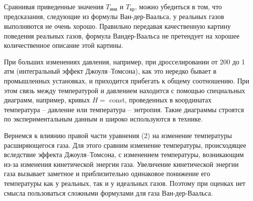 \documentclass[a4paper, 12pt]{article}
\begin{document}
\indent Сравнивая приведенные значения $T_{\text{инв}}$ и $T_{\text{кр}}$, можно убедиться в том, что предсказания, следующие из формулы Ван-дер-Ваальса, у реальных газов выполняются не очень хорошо. Правильно передавая качественную картину поведения реальных газов, формула Вандер-Ваальса не претендует на хорошее количественное описание этой картины.

\indent При больших изменениях давления, например, при дросселировании от 200 до 1 атм (интегральный эффект Джоуля–Томсона), как это нередко бывает в промышленных установках, и приходится прибегать к общему соотношению. При этом связь между температурой и давлением находится с помощью специальных диаграмм, например, кривых $H = $ const, проведенных в координатах температура – давление или температура – энтропия. Такие диаграммы строятся по экспериментальным данным и широко используются в технике.

\indent Вернемся к влиянию правой части уравнения (2) на изменение температуры расширяющегося газа. Для этого сравним изменение температуры, происходящее вследствие эффекта Джоуля–Томсона, с изменением температуры, возникающим из-за изменения кинетической энергии газа. Увеличение кинетической энергии газа вызывает заметное и приблизительно одинаковое понижение его температуры как у реальных, так и у идеальных газов. Поэтому при оценках нет смысла пользоваться сложными формулами для газа Ван-дер-Ваальса.
\end{document}
